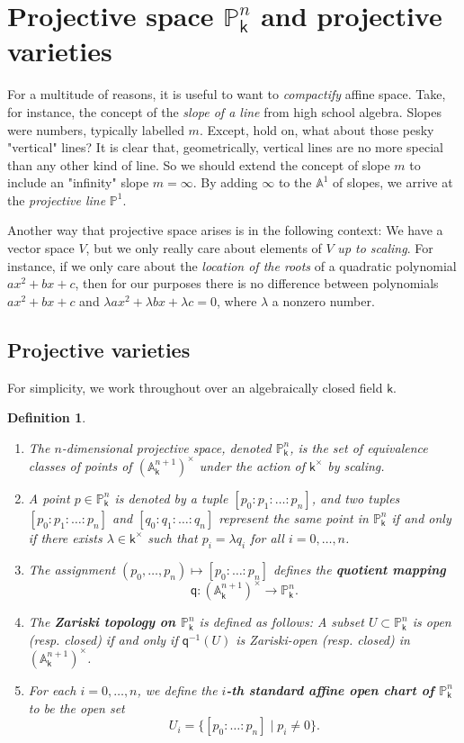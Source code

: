 \documentclass[11pt]{article}
\newcommand{\A}{\mathbb{A}}
\renewcommand{\P}{\mathbb{P}}
\newcommand{\q}{\mathsf{q}}
\renewcommand{\k}{\mathsf{k}}
\renewcommand{\to}{\longrightarrow}
\newcommand{\A}{\mathbb A}
\renewcommand{\k}{\mathsf{k}}
\renewcommand{\P}{\mathbb P}
\renewcommand{\to}{{\longrightarrow}}
\newtheorem{definition}{Definition}[section]
\begin{document}
\section{Projective space \(\P^n_{\k}\) and projective varieties}
\label{sec:orgf228950}
For a multitude of reasons, it is useful to want to \emph{compactify} affine space.  Take, for instance, the concept of the \emph{slope of a line} from high school algebra.  Slopes were numbers, typically labelled \(m\).  Except, hold on, what about those pesky "vertical" lines?  It is clear that, geometrically, vertical lines are no more special than any other kind of line.  So we should extend the concept of slope \(m\) to include an "infinity" slope \(m =\infty\). By adding \(\infty\) to the \(\A^1\) of slopes, we arrive at the \emph{projective line} \(\P^1\).

Another way that projective space arises is in the following context:  We have a vector space \(V\), but we only really care  about elements of \(V\) \emph{up to scaling}.  For instance, if we only care about the \emph{location of the roots} of a quadratic polynomial \(ax^2+bx+c\), then for our purposes there is no difference between polynomials \(ax^2+bx+c\) and \(\lambda a x^2 + \lambda b x + \lambda c =0\), where \(\lambda\) a nonzero number.
\subsection{Projective varieties}
\label{sec:org6ea3458}
For simplicity, we work throughout over an algebraically closed field \(\k\).

\begin{definition}
\begin{enumerate}
\item The \(n\)-dimensional projective space, denoted \(\P^n_{\k}\), is the set of equivalence classes of points of \(\left(\A^{n+1}_{\k}\right)^{\times}\) under the action of \(\k^{\times}\) by scaling.
\item A point \(p \in  \P^n_{\k}\) is denoted by a tuple \([p_0 : p_1 : \ldots : p_n]\), and two tuples \([p_0 : p_1 : \ldots : p_n]\) and \([q_0 : q_1 : \dots : q_n]\) represent the same point in \(\P^n_{\k}\) if and only if there exists \(\lambda \in \k^{\times}\) such that \(p_i = \lambda q_i\) for all \(i = 0,\ldots, n\).
\item The assignment \((p_0, \dots, p_n) \mapsto [p_0 : \dots : p_n]\) defines the \textbf{\emph{quotient mapping}} \[\q : \left( \A^{n+1}_{\k}\right)^{\times} \to \P^n_{\k}.\]
\item The \textbf{\emph{Zariski topology on \(\P^n_{\k}\)}} is defined as follows: A subset \(U \subset \P^n_{\k}\) is open (resp. closed) if and only if \(\q^{-1}(U)\) is Zariski-open (resp. closed) in  \(\left( \A^{n+1}_{\k}\right)^{\times}\).
\item For each \(i=0, \ldots, n\), we define the \textbf{\emph{\(i\)-th standard affine open chart of \(\P^n_{\k}\)}} to be the open set \[U_{i} = \big\{ [p_{0}: \ldots : p_n] \mid p_i \neq 0 \big\}.\]
\end{enumerate}
\end{definition}
\end{document}
